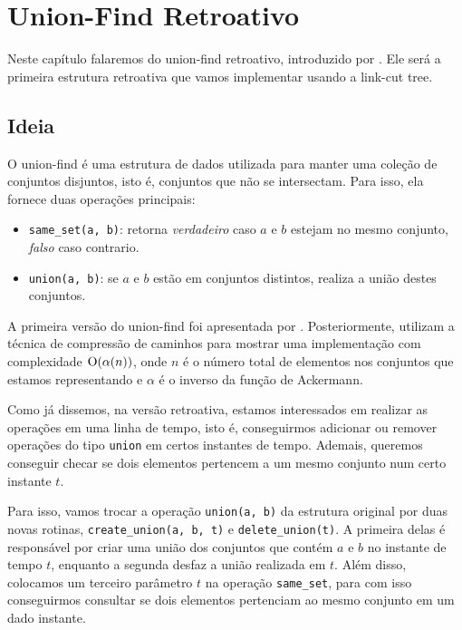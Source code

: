 
\chapter{Union-Find Retroativo}
\label{cap:union-find}

Neste capítulo falaremos do union-find retroativo, introduzido por \citet{10.1145/1240233.1240236}. Ele será a primeira estrutura retroativa que vamos implementar usando a link-cut tree.

\section{Ideia}
\label{sec:uf-ideia}

O union-find é uma estrutura de dados utilizada para manter uma coleção de conjuntos disjuntos, isto é, conjuntos que não se intersectam. Para isso, ela fornece duas operações principais:

\begin{itemize}
    \item \texttt{same\_set(a, b)}: retorna \emph{verdadeiro} caso $a$ e $b$ estejam no mesmo conjunto, \emph{falso} caso contrario.
    \item \texttt{union(a, b)}: se $a$ e $b$ estão em conjuntos distintos, realiza a união destes conjuntos.
\end{itemize}

A primeira versão do union-find foi apresentada por \citet{10.1145/364099.364331}. Posteriormente, \citet{10.1145/62.2160} utilizam a técnica de compressão de caminhos para mostrar uma implementação com complexidade $\mathrm{O}( \alpha (n) )$, onde $n$ é o número total de elementos nos conjuntos que estamos representando e $\alpha$ é o inverso da função de Ackermann.

Como já dissemos, na versão retroativa, estamos interessados em realizar as operações em uma linha de tempo, isto é, conseguirmos adicionar ou remover operações do tipo \texttt{union} em certos instantes de tempo. Ademais, queremos conseguir checar se dois elementos pertencem a um mesmo conjunto num certo instante $t$.

Para isso, vamos trocar a operação \texttt{union(a, b)} da estrutura original por duas novas rotinas, \texttt{create\_union(a, b, t)} e \texttt{delete\_union(t)}. A primeira delas é responsável por criar uma união dos conjuntos que contém $a$ e $b$ no instante de tempo $t$, enquanto a segunda desfaz a união realizada em $t$. Além disso, colocamos um terceiro parâmetro $t$ na operação \texttt{same\_set}, para com isso conseguirmos consultar se dois elementos pertenciam ao mesmo conjunto em um dado instante.

